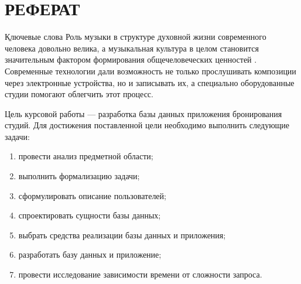 \chapter*{РЕФЕРАТ}
\b{Ключевые слова}
Роль музыки в структуре духовной жизни современного человека довольно велика, а музыкальная культура в целом становится значительным фактором формирования общечеловеческих ценностей \cite{music_for_youth}.
Современные технологии дали возможность не только прослушивать композиции через электронные устройства, но и записывать их, а специально оборудованные студии помогают облегчить этот процесс.

Цель курсовой работы --- разработка базы данных приложения бронирования студий.
Для достижения поставленной цели необходимо выполнить следующие задачи:

\begin{enumerate}
	\item провести анализ предметной области;
	\item выполнить формализацию задачи;
	\item сформулировать описание пользователей;
	\item спроектировать сущности базы данных;
	\item выбрать средства реализации базы данных и приложения;
	\item разработать базу данных и приложение;
	\item провести исследование зависимости времени от сложности запроса.
\end{enumerate}